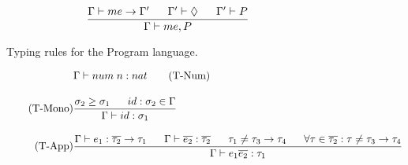 \begin{figure}[htb]
\begin{align*}
&\frac
{\Gamma \vdash me \rightarrow \Gamma' \;\;\;\;\;\; \Gamma' \vdash \Diamond \;\;\;\;\;\; \Gamma' \vdash P}
{\Gamma \vdash me, P}
\end{align*}
\caption{Typing rules for the Program language. \label{fig:TypeRulesProgram}}
\end{figure}

\begin{figure}[htb]
\begin{align*}
&\Gamma \vdash num \; n : nat \tag{T-Num}
\\[1em]
\tag{T-Mono}
&\frac{\sigma_{2} \geq \sigma_{1} \longspace id:\sigma_{2} \in \Gamma}{\Gamma \vdash id:\sigma_{1}}
\\[1em]
\tag{T-App}
&\frac{\Gamma \vdash e_{1}:\overline{\tau_{2}} \rightarrow \tau_{1} \longspace \Gamma \vdash \overline{e_{2}}:\overline{\tau_{2}} \longspace \tau_{1} \neq \tau_{3} \rightarrow \tau_{4} \longspace \forall \tau \in \overline{\tau_{2}} : \tau \neq \tau_{3} \rightarrow \tau_{4}}
{\Gamma \vdash e_{1} \overline{e_{2}}:\tau_{1}}
\\[1em]
%
%

\end{align*}
\end{figure}
